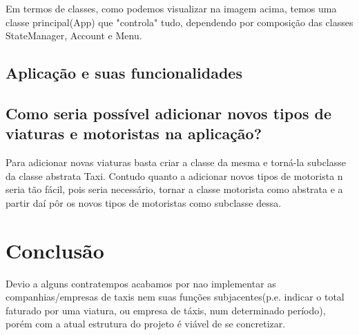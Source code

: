 \documentclass[a4paper,12pt,portuguese]{report}
\begin{document}
Em termos de classes, como podemos visualizar na imagem acima, temos uma classe principal(App) que "controla" tudo, dependendo por composição das classes StateManager, Account e Menu.

\section{Aplicação e suas funcionalidades}

\section{Como seria possível adicionar novos tipos de viaturas e motoristas na aplicação?}

Para adicionar novas viaturas basta criar a classe da mesma e torná-la subclasse da classe abstrata Taxi. Contudo quanto a adicionar novos tipos de motorista n seria tão fácil, pois seria necessário, tornar a classe motorista como abstrata e a partir daí pôr os novos tipos de motoristas como subclasse dessa.

\chapter{Conclusão}
Devio a alguns contratempos acabamos por nao implementar as companhias/empresas de taxis nem suas funções subjacentes(p.e. indicar o total faturado por uma viatura, ou empresa de táxis, num determinado período), porém com a atual estrutura do projeto é viável de se concretizar.
\end{document}
